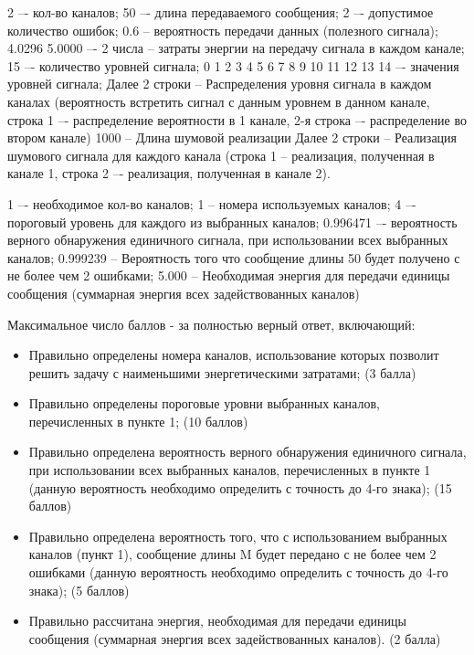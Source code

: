 
2 –- кол-во каналов;
50 –- длина передаваемого сообщения;
2 –- допустимое количество ошибок;
0.6 -- вероятность передачи данных (полезного сигнала);
4.0296 5.0000 –- 2 числа -- затраты энергии на передачу сигнала в каждом канале;
15 –- количество уровней сигнала;
0 1 2 3 4 5 6 7 8 9 10 11 12 13 14 –- значения уровней сигнала;
Далее 2 строки -- Распределения уровня сигнала в каждом каналах (вероятность встретить сигнал с данным уровнем в данном канале, строка 1 –- распределение вероятности в 1 канале, 2-я строка –- распределение во втором канале)
1000 -- Длина шумовой реализации
Далее 2 строки -- Реализация шумового сигнала для каждого канала (строка 1 -- реализация, полученная в канале 1, строка 2 –- реализация, полученная в канале 2).


\outputfmtSection

1 –- необходимое кол-во каналов;
1 -- номера используемых каналов;
4 –- пороговый уровень для каждого из выбранных каналов;
0.996471 –- вероятность верного обнаружения единичного сигнала, при использовании всех выбранных каналов;
0.999239 -- Вероятность того что сообщение длины 50 будет получено с не более чем 2 ошибками;
5.000 -- Необходимая энергия для передачи единицы сообщения (суммарная энергия всех задействованных каналов)

\markSection

Максимальное число баллов - за полностью верный ответ, включающий:

\begin{itemize}
    \item Правильно определены номера каналов, использование которых позволит решить задачу с наименьшими энергетическими затратами; (3 балла)
    \item Правильно определены пороговые уровни выбранных каналов, перечисленных в пункте 1; (10 баллов)
    \item Правильно определена вероятность верного обнаружения единичного сигнала, при использовании всех выбранных каналов, перечисленных в пункте 1 (данную вероятность необходимо определить с точность до 4-го знака); (15 баллов)
    \item Правильно определена вероятность того, что с использованием выбранных каналов (пункт 1), сообщение длины M будет передано с не более чем 2 ошибками (данную вероятность необходимо определить с точность до 4-го знака); (5 баллов)
    \item Правильно рассчитана энергия, необходимая для передачи единицы сообщения (суммарная энергия всех задействованных каналов). (2 балла)
\end{itemize}

